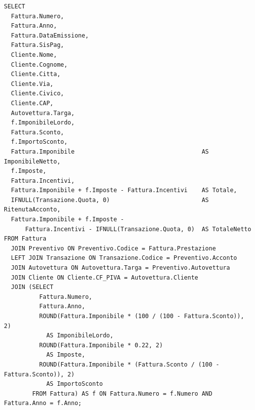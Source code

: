 \begin{description}
              \begin{lstlisting}
SELECT
  Fattura.Numero,
  Fattura.Anno,
  Fattura.DataEmissione,
  Fattura.SisPag,
  Cliente.Nome,
  Cliente.Cognome,
  Cliente.Citta,
  Cliente.Via,
  Cliente.Civico,
  Cliente.CAP,
  Autovettura.Targa,
  f.ImponibileLordo,
  Fattura.Sconto,
  f.ImportoSconto,
  Fattura.Imponibile                                    AS ImponibileNetto,
  f.Imposte,
  Fattura.Incentivi,
  Fattura.Imponibile + f.Imposte - Fattura.Incentivi    AS Totale,
  IFNULL(Transazione.Quota, 0)                          AS RitenutaAcconto,
  Fattura.Imponibile + f.Imposte - 
      Fattura.Incentivi - IFNULL(Transazione.Quota, 0)  AS TotaleNetto
FROM Fattura
  JOIN Preventivo ON Preventivo.Codice = Fattura.Prestazione
  LEFT JOIN Transazione ON Transazione.Codice = Preventivo.Acconto
  JOIN Autovettura ON Autovettura.Targa = Preventivo.Autovettura
  JOIN Cliente ON Cliente.CF_PIVA = Autovettura.Cliente
  JOIN (SELECT
          Fattura.Numero,
          Fattura.Anno,
          ROUND(Fattura.Imponibile * (100 / (100 - Fattura.Sconto)), 2)
            AS ImponibileLordo,
          ROUND(Fattura.Imponibile * 0.22, 2)                                      
            AS Imposte,
          ROUND(Fattura.Imponibile * (Fattura.Sconto / (100 - Fattura.Sconto)), 2) 
            AS ImportoSconto
        FROM Fattura) AS f ON Fattura.Numero = f.Numero AND Fattura.Anno = f.Anno;
              \end{lstlisting}

          \end{description}
